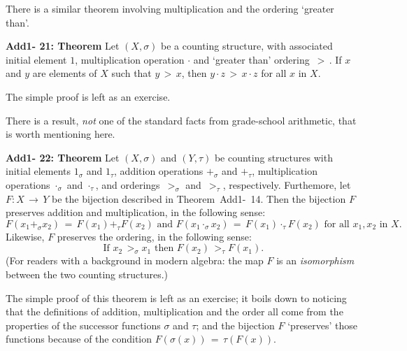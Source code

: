 {\V
\V

        There is a similar theorem involving multiplication and the ordering `greater than'.

\V

        {\bf Add1- 21: Theorem} Let $(X,{\sigma})$ be a counting structure, with associated initial element $1$,
    multiplication operation ${\cdot}$ and `greater than' ordering $\,>\,$.
    If $x$ and $y$  are elements of $X$ such that $y\,>\,x$,
    then $y{\cdot}z\,>\,x{\cdot}z$ for all $x$ in $X$.

\V

        The simple proof is left as an exercise.

\V
\V


        There is a result, {\em not} one  of the standard facts from grade-school arithmetic, that is worth mentioning here.

\V
\V

        {\bf Add1- 22: Theorem} Let $(X,{\sigma})$ and $(Y,{\tau})$ be counting structures with initial elements $1_{{\sigma}}$ and $1_{{\tau}}$,
    addition operations $+_{{\sigma}}$ and $+_{{\tau}}$,
    multiplication operations ${\cdot}_{{\sigma}}$ and ${\cdot}_{{\tau}}$, and orderings $\,>_{{\sigma}}$ and $\,>_{{\tau}}$, respectively.
    Furthemore, let $F:X \,{\rightarrow}\, Y$ be the bijection described in Theorem~Add1-~14.
  Then the bijection $F$ preserves addition and multiplication, in the following sense:
        \begin{displaymath}
        F(x_{1}+_{{\sigma}}x_{2}) \,=\, F(x_{1}) +_{{\tau}} F(x_{2}) \mbox{ and }
        F(x_{1}{\cdot}_{{\sigma}}x_{2}) \,=\, F(x_{1}) {\cdot}_{{\tau}} F(x_{2})
    \mbox{ for all $x_{1},x_{2}$ in $X$}.
        \end{displaymath}
    Likewise, $F$ preserves the ordering, in the following sense:
        \begin{displaymath}
        \mbox{ If $x_{2}\,>_{{\sigma}}x_{1}$ then $F(x_{2})\,>_{{\tau}}F(x_{1})$}.
        \end{displaymath}
    (For readers with a background in modern algebra: the map $F$ is an {\em isomorphism} between the two counting structures.)


    The simple proof of this theorem is left as an exercise; it boils down to noticing that the definitions of
    addition, multiplication and the order all come from the properties of  the successor functions ${\sigma}$ and ${\tau}$;
    and the bijection $F$ `preserves' those functions because of the condition $F({\sigma}(x)) \,=\, {\tau}(F(x))$.

}
